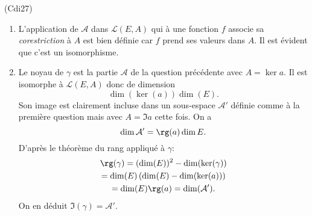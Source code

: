 \begin{tiny}(Cdi27)\end{tiny} 
\begin{enumerate}
  \item L'application de $\mathcal{A}$ dans $\mathcal{L}(E,A)$ qui à une fonction $f$ associe sa \emph{corestriction} à $A$ est bien définie car $f$ prend ses valeurs dans $A$. Il est évident que c'est un isomorphisme.
  \item Le noyau de $\gamma$ est la partie $\mathcal{A}$ de la question précédente avec $A = \ker a$. Il est isomorphe à $\mathcal{L}(E,A)$ donc de dimension 
\[
  \dim( \ker(a)) \dim(E).
\]
Son image est clairement incluse dans un sous-espace $\mathcal{A}'$ définie comme à la première question mais avec $A= \Im a$ cette fois. On a
\[
  \dim \mathcal{A}' = \rg(a) \dim E.
\]
D'après le théorème du rang appliqué à $\gamma$:
\begin{multline*}
  \rg(\gamma) = (\dim(E))^2 - \dim(\ker(\gamma))\\
  = \dim(E) \left( \dim(E) - \dim(\ker(a)) \right)\\
  = \dim(E) \rg(a) = \dim(\mathcal{A}').
\end{multline*}
On en déduit $\Im(\gamma) = \mathcal{A}'$.
\end{enumerate}

